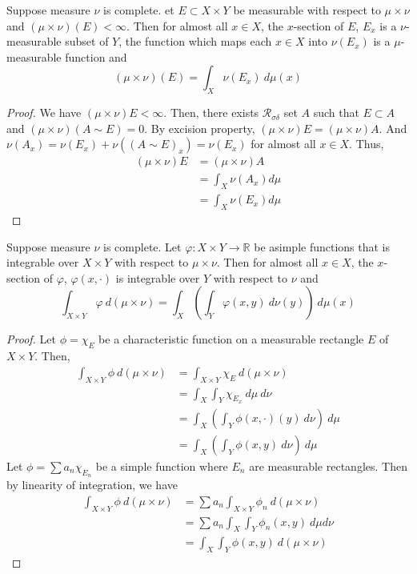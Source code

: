 \begin{theorem}
	Suppose measure $\nu$ is complete.
	et $E \subset X \times Y$ be measurable with respect to $\mu \times \nu$ and $(\mu \times \nu)(E) < \infty$.
	Then for almost all $x \in X$, the $x$-section of $E$, $E_x$ is a $\nu$-measurable subset of $Y$, the function which maps each $x \in X$ into $\nu(E_x)$ is a $\mu$-measurable function and
	\begin{equation}
		(\mu \times \nu)(E) = \int_X \nu(E_x) \ d\mu(x)
	\end{equation}
\end{theorem}
\begin{proof}
	We have $(\mu \times \nu)E < \infty$.
	Then, there exists $\mathcal{R}_{\sigma\delta}$ set $A$ such that $E \subset A$ and $(\mu \times \nu)(A \sim E) = 0$.
	By excision property, $(\mu \times \nu)E = (\mu \times \nu)A$.
	And $\nu(A_x) = \nu(E_x) + \nu((A \sim E)_x) = \nu(E_x)$ for almost all $x \in X$.
	Thus,
	\begin{align*}
		(\mu \times \nu)E
		& = (\mu \times \nu)A\\
		& = \int_X \nu(A_x)d\mu \\
		& = \int_X \nu(E_x)d\mu
	\end{align*}
\end{proof}

\begin{theorem}
	Suppose measure $\nu$ is complete.
	Let $\varphi : X \times Y \to \mathbb{R}$ be asimple functions that is integrable over $X \times Y$ with respect to $\mu \times \nu$.
	Then for almost all $x \in X$, the $x$-section of $\varphi$, $\varphi(x,\cdot)$ is integrable over $Y$ with respect to $\nu$ and
	\begin{equation}
		\int_{X \times Y} \varphi \ d(\mu \times \nu) = \int_X \left( \int_Y  \varphi(x,y) \ d\nu(y) \right) \ d\mu(x)
	\end{equation}
\end{theorem}
\begin{proof}
	Let $\phi = \chi_E$ be a characteristic function on a measurable rectangle $E$ of $X \times Y$.
	Then,
	\begin{align*}
	\int_{X \times Y} \phi \ d(\mu \times \nu) 
		& = \int_{X \times Y} \chi_E \ d(\mu \times \nu) \\
		& = \int_X \int_Y \chi_{E_x} \ d\mu \ d\nu \\
		& = \int_X \left( \int_Y \phi(x,\cdot)(y) \ d\nu \right) \ d\mu \\
		& = \int_X \left( \int_Y \phi(x,y) \ d\nu \right) \ d\mu 
	\end{align*}
	Let $\phi = \sum a_n \chi_{E_n}$ be a simple function where $E_n$ are measurable rectangles.
	Then by linearity of integration, we have
	\begin{align*}
	\int_{X \times Y} \phi \ d(\mu \times \nu) 
		& = \sum a_n \int_{X \times Y} \phi_n \ d(\mu \times \nu) \\
		& = \sum a_n \int_X \int_Y \phi_n(x,y) \ d\mu d\nu \\
		& = \int_X \int_Y \phi(x,y) \ d(\mu \times \nu)
	\end{align*}
\end{proof}

